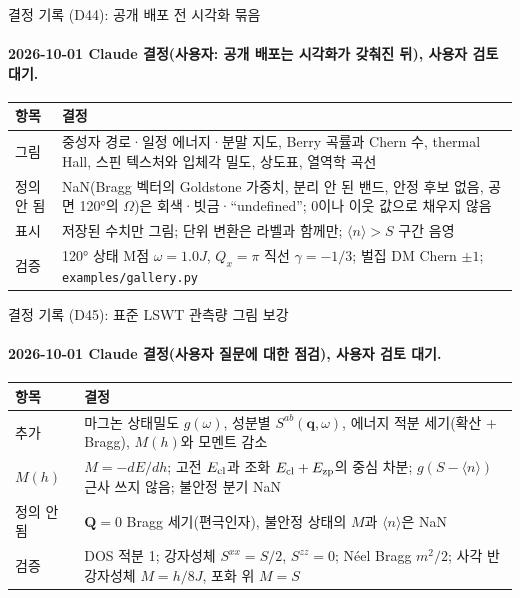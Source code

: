\begin{frame}[label=decisions-d44-figures]{결정 기록 (D44): 공개 배포 전 시각화 묶음}
  \framesubtitle{2026-10-01 Claude 결정(사용자: 공개 배포는 시각화가 갖춰진 뒤), 사용자 검토 대기.}
  \small\renewcommand{\arraystretch}{1.12}
  \begin{tabularx}{\textwidth}{@{}P{3.0cm}Y@{}}
    \toprule
    항목 & 결정 \\
    \midrule
    그림 & 중성자 경로·일정 에너지·분말 지도, Berry 곡률과 Chern 수, thermal Hall, 스핀 텍스처와 입체각 밀도, 상도표, 열역학 곡선 \\
    정의 안 됨 & NaN(Bragg 벡터의 Goldstone 가중치, 분리 안 된 밴드, 안정 후보 없음, 공면 120°의 $\Omega$)은 회색·빗금·``undefined''; 0이나 이웃 값으로 채우지 않음 \\
    표시 & 저장된 수치만 그림; 단위 변환은 라벨과 함께만; $\langle n\rangle>S$ 구간 음영 \\
    검증 & 120° 상태 M점 $\omega=1.0J$, $Q_x=\pi$ 직선 $\gamma=-1/3$; 벌집 DM Chern $\pm1$; \texttt{examples/gallery.py} \\
    \bottomrule
  \end{tabularx}
\end{frame}

\begin{frame}[label=decisions-d45-standard]{결정 기록 (D45): 표준 LSWT 관측량 그림 보강}
  \framesubtitle{2026-10-01 Claude 결정(사용자 질문에 대한 점검), 사용자 검토 대기.}
  \small\renewcommand{\arraystretch}{1.12}
  \begin{tabularx}{\textwidth}{@{}P{3.0cm}Y@{}}
    \toprule
    항목 & 결정 \\
    \midrule
    추가 & 마그논 상태밀도 $g(\omega)$, 성분별 $S^{ab}(\mathbf q,\omega)$, 에너지 적분 세기(확산 + Bragg), $M(h)$와 모멘트 감소 \\
    $M(h)$ & $M=-dE/dh$; 고전 $E_{\rm cl}$과 조화 $E_{\rm cl}+E_{\rm zp}$의 중심 차분; $g(S-\langle n\rangle)$ 근사 쓰지 않음; 불안정 분기 NaN \\
    정의 안 됨 & $\mathbf Q=0$ Bragg 세기(편극인자), 불안정 상태의 $M$과 $\langle n\rangle$은 NaN \\
    검증 & DOS 적분 1; 강자성체 $S^{xx}=S/2$, $S^{zz}=0$; Néel Bragg $m^2/2$; 사각 반강자성체 $M=h/8J$, 포화 위 $M=S$ \\
    \bottomrule
  \end{tabularx}
\end{frame}

